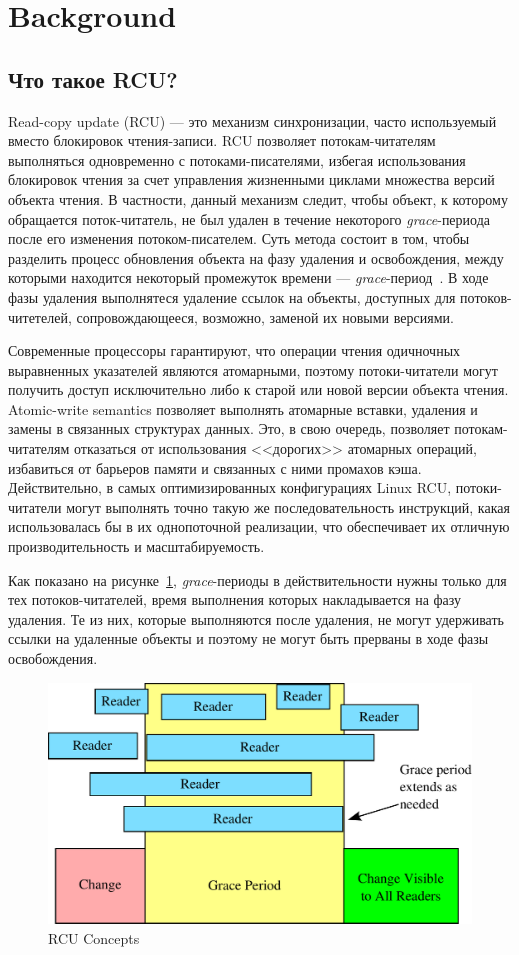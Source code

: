 \section{Background}

\subsection{Что такое RCU?}

Read-copy update (RCU) --- это механизм синхронизации,
часто используемый вместо блокировок чтения-записи.
RCU позволяет потокам-читателям выполняться одновременно
с потоками-писателями, избегая использования блокировок
чтения за счет управления жизненными циклами
множества версий объекта чтения.
В частности, данный механизм следит, чтобы объект,
к которому обращается поток-читатель,
не был удален в течение некоторого \emph{grace}-периода
после его изменения потоком-писателем.
Суть метода состоит в том, чтобы разделить процесс обновления
объекта на фазу удаления и освобождения, между которыми находится
некоторый промежуток времени --- \emph{grace}-период~\cite{McKenneyRCU98}.
В ходе фазы удаления выполнятеся удаление ссылок на объекты,
доступных для потоков-читетелей, сопровождающееся, возможно,
заменой их новыми версиями.

Современные процессоры гарантируют, что операции чтения
одичночных выравненных указателей являются атомарными,
поэтому потоки-читатели могут получить доступ исключительно
либо к старой или новой версии объекта чтения.
Atomic-write semantics позволяет выполнять атомарные вставки, удаления и
замены в связанных структурах данных.
Это, в свою очередь, позволяет потокам-читателям отказаться
от использования <<дорогих>> атомарных операций,
избавиться от барьеров памяти и связанных с ними промахов кэша.
Действительно, в самых оптимизированных конфигурациях Linux RCU,
потоки-читатели могут выполнять точно такую же последовательность
инструкций, какая использовалась бы в их однопоточной реализации,
что обеспечивает их отличную производительность и масштабируемость.

Как показано на рисунке~\ref{fig:rcu_concepts}, \emph{grace}-периоды
в действительности нужны только для тех потоков-читателей, время выполнения
которых накладывается на фазу удаления.
Те из них, которые выполняются после удаления, не могут удерживать ссылки
на удаленные объекты и поэтому не могут быть прерваны в ходе фазы освобождения.

\begin{figure}[tbp]
\centering
\includegraphics[scale=0.35]{rcu_concepts.pdf}
\caption{RCU Concepts}
\label{fig:rcu_concepts}
\end{figure}


